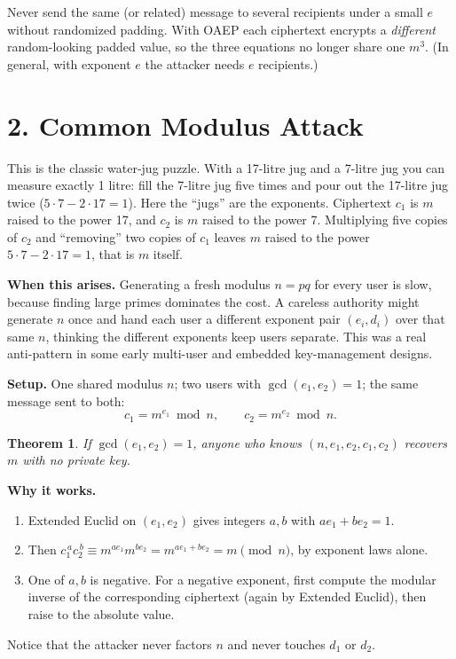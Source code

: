 \documentclass[11pt]{article}
\newtheorem{theorem}{Theorem}
\begin{document}
\begin{fixbox}
Never send the same (or related) message to several recipients under a small $e$ without randomized padding. With OAEP each ciphertext encrypts a \emph{different} random-looking padded value, so the three equations no longer share one $m^3$. (In general, with exponent $e$ the attacker needs $e$ recipients.)
\end{fixbox}

\hrulefill

\section*{2. Common Modulus Attack}

\begin{intuition}
This is the classic water-jug puzzle. With a 17-litre jug and a 7-litre jug you can measure exactly 1 litre: fill the 7-litre jug five times and pour out the 17-litre jug twice ($5\cdot7-2\cdot17=1$). Here the ``jugs'' are the exponents. Ciphertext $c_1$ is $m$ raised to the power 17, and $c_2$ is $m$ raised to the power 7. Multiplying five copies of $c_2$ and ``removing'' two copies of $c_1$ leaves $m$ raised to the power $5\cdot 7-2\cdot 17=1$, that is $m$ itself.
\end{intuition}

\textbf{When this arises.} Generating a fresh modulus $n=pq$ for every user is slow, because finding large primes dominates the cost. A careless authority might generate $n$ once and hand each user a different exponent pair $(e_i,d_i)$ over that same $n$, thinking the different exponents keep users separate. This was a real anti-pattern in some early multi-user and embedded key-management designs.

\textbf{Setup.} One shared modulus $n$; two users with $\gcd(e_1,e_2)=1$; the same message sent to both:
\[
c_1=m^{e_1}\bmod n,\qquad c_2=m^{e_2}\bmod n.
\]

\begin{theorem}
If $\gcd(e_1,e_2)=1$, anyone who knows $(n,e_1,e_2,c_1,c_2)$ recovers $m$ with no private key.
\end{theorem}

\textbf{Why it works.}
\begin{enumerate}[nosep]
\item Extended Euclid on $(e_1,e_2)$ gives integers $a,b$ with $ae_1+be_2=1$.
\item Then $c_1^{\,a}c_2^{\,b}\equiv m^{ae_1}m^{be_2}=m^{ae_1+be_2}=m \pmod n$, by exponent laws alone.
\item One of $a,b$ is negative. For a negative exponent, first compute the modular inverse of the corresponding ciphertext (again by Extended Euclid), then raise to the absolute value.
\end{enumerate}
Notice that the attacker never factors $n$ and never touches $d_1$ or $d_2$.
\end{document}
